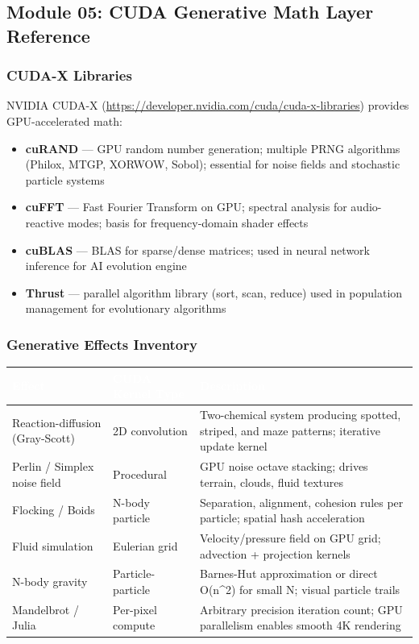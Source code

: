 \documentclass[11pt,letterpaper]{article}
\newcommand{\tableheader}[1]{\textbf{\sffamily\textcolor{white}{#1}}}
\begin{document}
\subsection{Module 05: CUDA Generative Math Layer Reference}

\subsubsection{CUDA-X Libraries}

NVIDIA CUDA-X (\url{https://developer.nvidia.com/cuda/cuda-x-libraries}) provides GPU-accelerated math:
\begin{itemize}
\item \textbf{cuRAND} --- GPU random number generation; multiple PRNG algorithms (Philox, MTGP, XORWOW, Sobol); essential for noise fields and stochastic particle systems
\item \textbf{cuFFT} --- Fast Fourier Transform on GPU; spectral analysis for audio-reactive modes; basis for frequency-domain shader effects
\item \textbf{cuBLAS} --- BLAS for sparse/dense matrices; used in neural network inference for AI evolution engine
\item \textbf{Thrust} --- parallel algorithm library (sort, scan, reduce) used in population management for evolutionary algorithms
\end{itemize}

\subsubsection{Generative Effects Inventory}

\begin{center}
\begin{tabularx}{\textwidth}{L{3.5cm}L{2.5cm}X}
\toprule
{}
\tableheader{Effect} & \tableheader{CUDA Kernel Type} & \tableheader{Description} \\
\midrule
Reaction-diffusion (Gray-Scott) & 2D convolution & Two-chemical system producing spotted, striped, and maze patterns; iterative update kernel \\
Perlin / Simplex noise field & Procedural & GPU noise octave stacking; drives terrain, clouds, fluid textures \\
Flocking / Boids & N-body particle & Separation, alignment, cohesion rules per particle; spatial hash acceleration \\
Fluid simulation & Eulerian grid & Velocity/pressure field on GPU grid; advection + projection kernels \\
N-body gravity & Particle-particle & Barnes-Hut approximation or direct O(n\^{}2) for small N; visual particle trails \\
Mandelbrot / Julia & Per-pixel compute & Arbitrary precision iteration count; GPU parallelism enables smooth 4K rendering \\
\bottomrule
\end{tabularx}
\end{center}
\end{document}
